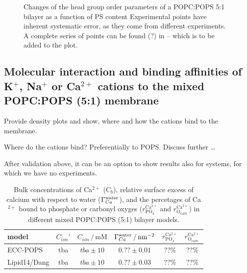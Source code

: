 \documentclass[journal=jpcbfk,manuscript=article]{achemso}
\begin{document}
\begin{figure}[htb!]
  \caption{\label{fig:delta_ordPar_NaCl_PC-PS_mix} 
    Changes of the head group order parameters of a POPC:POPS 5:1 bilayer as a function of PS content
    Experimental points have inherent systematic error, as they come from different experiments.
    A complete series of points can be found (?) in \cite{roux90} -- which is to be added to the plot.
  } 
\end{figure} 



 
 
 


\subsection{Molecular interaction and binding affinities of K$^+$, Na$^+$ or Ca$^{2+}$  cations to the mixed POPC:POPS (5:1) membrane} 
\label{sec:affinity} 

Provide density plots and show, where and how the cations bind to the membrane. 

Where do the cations bind? Preferentially to POPS. Discuss further \dots 

After validation above, it can be an option to show results also for systems, for which we have no experiments. 
 
\begin{table}[tb!] 
  \caption{Bulk concentrations of Ca$^{2+}$ (C$_b$), relative surface excess of calcium with respect to water ($\Gamma_{Ca}^{\rm water}$), 
    and the percetages of Ca$^{2+}$ bound to phosphate or carbonyl oxyges ($r^\mathrm{Ca^{2+}} _\mathrm{PO_4} $ and $r^\mathrm{Ca^{2+}} _\mathrm{O_{carb.}}$) 
    in different mixed POPC:POPS (5:1) bilayer models. 
  \label{tab:binding}} 
  \begin{tabular}{l|c c | c | c c} 
    model                  & $C_{ion}'$ & $C_{ion}\,/\,\mathrm{mM}$ & $\Gamma_{Ca}^{\rm water} \,/\, \mathrm{nm}^{-2}$  & $r^\mathrm{Ca^{2+}} _\mathrm{PO_4} $ & $r^\mathrm{Ca^{2+}} _\mathrm{O_{carb.}} $ \\ 
    \hline 
    ECC-POPS               &  tba  &  $tba\pm 10 $  &  $0.?? \pm 0.01 $   &  ??\%  &    ??\%    \\ 
    Lipid14/Dang           &  tba  &  $tba\pm 10 $  &  $0.?? \pm 0.03 $   &  ??\%  &    ??\%    \\ 
  \end{tabular} 
\end{table} 
 
 
 
\end{document}
